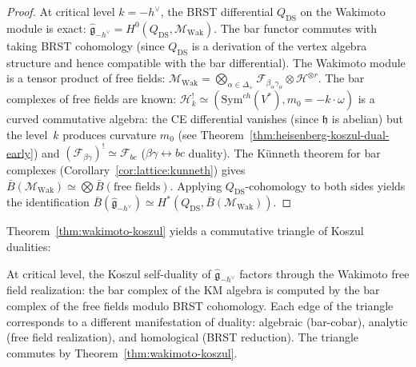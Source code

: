 \begin{proof}
At critical level $k = -h^\vee$, the BRST differential $Q_{\mathrm{DS}}$ on the Wakimoto module is exact: $\widehat{\mathfrak{g}}_{-h^\vee} = H^0(Q_{\mathrm{DS}}, \mathcal{M}_{\mathrm{Wak}})$.  The bar functor commutes with taking BRST cohomology (since $Q_{\mathrm{DS}}$ is a derivation of the vertex algebra structure and hence compatible with the bar differential).  The Wakimoto module is a tensor product of free fields: $\mathcal{M}_{\mathrm{Wak}} = \bigotimes_{\alpha \in \Delta_+} \mathcal{F}_{\beta_\alpha\gamma_\alpha} \otimes \mathcal{H}^{\otimes r}$.  The bar complexes of free fields are known: $\mathcal{H}_k^! \simeq (\mathrm{Sym}^{ch}(V^*), m_0 = -k \cdot \omega)$ is a curved commutative algebra: the CE differential vanishes (since $\mathfrak{h}$ is abelian) but the level~$k$ produces curvature $m_0$ (see Theorem~\ref{thm:heisenberg-koszul-dual-early}) and $(\mathcal{F}_{\beta\gamma})^! \simeq \mathcal{F}_{bc}$ ($\beta\gamma \leftrightarrow bc$ duality).  The K\"unneth theorem for bar complexes (Corollary~\ref{cor:lattice:kunneth}) gives $\bar{B}(\mathcal{M}_{\mathrm{Wak}}) \simeq \bigotimes \bar{B}(\text{free fields})$.  Applying $Q_{\mathrm{DS}}$-cohomology to both sides yields the identification $\bar{B}(\widehat{\mathfrak{g}}_{-h^\vee}) \simeq H^*(Q_{\mathrm{DS}}, \bar{B}(\mathcal{M}_{\mathrm{Wak}}))$.
\end{proof}

\begin{remark}\label{rem:wakimoto-triangle}
Theorem~\ref{thm:wakimoto-koszul} yields a commutative triangle of Koszul dualities:
\begin{center}
\end{center}
At critical level, the Koszul self-duality of $\widehat{\mathfrak{g}}_{-h^\vee}$ factors through the Wakimoto free field realization: the bar complex of the KM algebra is computed by the bar complex of the free fields modulo BRST cohomology.  Each edge of the triangle corresponds to a different manifestation of duality: algebraic (bar-cobar), analytic (free field realization), and homological (BRST reduction).  The triangle commutes by Theorem~\ref{thm:wakimoto-koszul}.
\end{remark}

